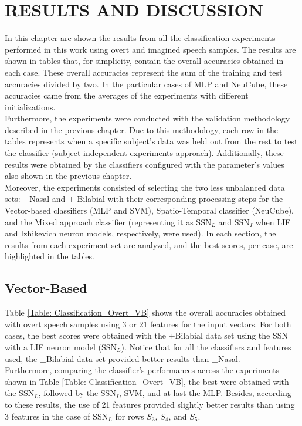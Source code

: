\chapter[RESULTS AND DISCUSSION]{\huge RESULTS AND DISCUSSION}
In this chapter are shown the results from all the classification experiments performed in this work using overt and imagined speech samples. The results are shown in tables that, for simplicity,  contain the overall accuracies obtained in each case. These overall accuracies represent the sum of the training and test accuracies divided by two. In the particular cases of MLP and NeuCube, these accuracies came from the averages of the experiments with different initializations.\\

Furthermore, the experiments were conducted with the validation methodology described in the previous chapter. Due to this methodology, each row in the tables represents when a specific subject's data was held out from the rest to test the classifier (subject-independent experiments approach). Additionally, these results were obtained by the classifiers configured with the parameter's values also shown in the previous chapter.\\

Moreover, the experiments consisted of selecting the two less unbalanced data sets: $\pm$Nasal and $\pm$ Bilabial with their corresponding processing steps for the Vector-based classifiers (MLP and SVM), Spatio-Temporal classifier (NeuCube), and the Mixed approach classifier (representing it as $\mbox{SSN}_{L}$ and $\mbox{SSN}_{I}$ when LIF and Izhikevich neuron models, respectively, were used). In each section, the results from each experiment set are analyzed, and the best scores, per case, are highlighted in the tables.\\

\section{Vector-Based}
Table \ref{Table: Classification_Overt_VB} shows the overall accuracies obtained with overt speech samples using 3 or 21 features for the input vectors. For both cases, the best scores were obtained with the $\pm$Bilabial data set using the SSN with a LIF neuron model ($\mbox{SSN}_{L}$). Notice that for all the classifiers and features used, the $\pm$Bilabial data set provided better results than  $\pm$Nasal.\\

Furthermore, comparing the classifier's performances across the experiments shown in Table \ref{Table: Classification_Overt_VB}, the best were obtained with the $\mbox{SSN}_{L}$, followed by the $\mbox{SSN}_{I}$, SVM, and at last the MLP. Besides, according to these results, the use of 21 features provided slightly better results than using 3 features in the case of $\mbox{SSN}_{L}$ for rows $S_{3}$, $S_{4}$, and $S_{5}$.\\

